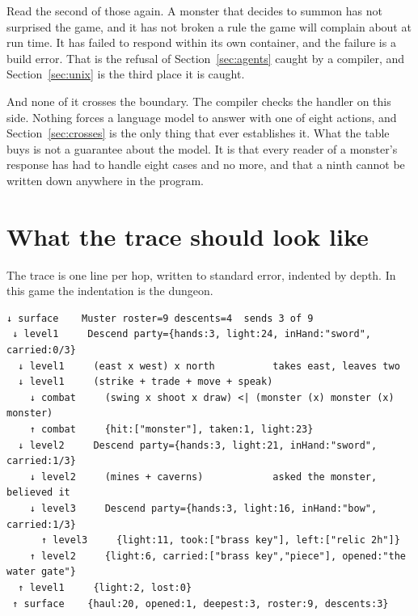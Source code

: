 \documentclass[11pt,a4paper]{article}
\begin{document}
\begin{sectionbox}
Read the second of those again. A monster that decides to summon has not surprised the game, and it
has not broken a rule the game will complain about at run time. It has failed to respond within its
own container, and the failure is a build error. That is the refusal of Section~\ref{sec:agents}
caught by a compiler, and Section~\ref{sec:unix} is the third place it is caught.
\end{sectionbox}

\begin{alarmbox}
And none of it crosses the boundary. The compiler checks the handler on this side. Nothing forces a
language model to answer with one of eight actions, and Section~\ref{sec:crosses} is the only thing
that ever establishes it. What the table buys is not a guarantee about the model. It is that every
reader of a monster's response has had to handle eight cases and no more, and that a ninth cannot
be written down anywhere in the program.
\end{alarmbox}

\section{What the trace should look like}
\label{sec:trace}

The trace is one line per hop, written to standard error, indented by depth. In this game the
indentation is the dungeon.

\begin{lstlisting}[breaklines=false, basicstyle=\ttfamily\footnotesize]
 ↓ surface    Muster roster=9 descents=4  sends 3 of 9
 ↓ level1     Descend party={hands:3, light:24, inHand:"sword", carried:0/3}
  ↓ level1     (east x west) x north          takes east, leaves two
  ↓ level1     (strike + trade + move + speak)
    ↓ combat     (swing x shoot x draw) <| (monster (x) monster (x) monster)
    ↑ combat     {hit:["monster"], taken:1, light:23}
  ↓ level2     Descend party={hands:3, light:21, inHand:"sword", carried:1/3}
    ↓ level2     (mines + caverns)            asked the monster, believed it
    ↓ level3     Descend party={hands:3, light:16, inHand:"bow", carried:1/3}
      ↑ level3     {light:11, took:["brass key"], left:["relic 2h"]}
    ↑ level2     {light:6, carried:["brass key","piece"], opened:"the water gate"}
  ↑ level1     {light:2, lost:0}
 ↑ surface    {haul:20, opened:1, deepest:3, roster:9, descents:3}
\end{lstlisting}
\end{document}
